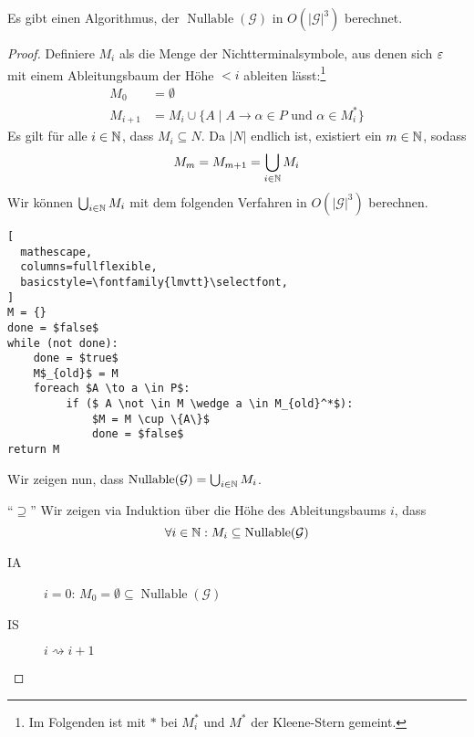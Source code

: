 \begin{Satz}\label{satz:3.nullable}
  Es gibt einen Algorithmus, der $\operatorname{Nullable}(\mathcal{G})$ in $O(|\mathcal{G}|^3)$ berechnet.
\end{Satz}
\begin{proof}
  Definiere $M_i$ als die Menge der Nichtterminalsymbole, aus denen sich
  $\varepsilon$ mit einem Ableitungsbaum der Höhe $< i$ ableiten lässt:\footnote{
  Im Folgenden ist mit $*$ bei $M_i^*$ und $M^*$ der Kleene-Stern gemeint.} 
  \begin{align*}
    M_0 &= \emptyset \\
    M_{i+1} &= M_i \cup \{ A \mid A \to \alpha \in P \text{ und }
              \alpha \in M_i^* \}
  \end{align*}
  Es gilt für alle $i \in \mathbb{N}$, dass $M_i \subseteq N$.
  Da $|N|$ endlich ist, existiert ein $m \in \mathbb{N}$, sodass
  \begin{displaymath}
    M_m = M_{m+1} = \bigcup_{i \in \mathbb{N}} M_i
  \end{displaymath}
  Wir können $\bigcup_{i \in \mathbb{N}} M_i$ mit dem folgenden Verfahren in $O(|\mathcal{G}|^3)$ berechnen.
  
  \begin{center}
  \begin{minipage}{7cm}
  \begin{lstlisting}[
  mathescape,
  columns=fullflexible,
  basicstyle=\fontfamily{lmvtt}\selectfont,
]
M = {}
done = $false$
while (not done):
    done = $true$
    M$_{old}$ = M
    foreach $A \to a \in P$:
         if ($ A \not \in M \wedge a \in M_{old}^*$):
             $M = M \cup \{A\}$
             done = $false$
return M
\end{lstlisting}
\end{minipage}
\end{center}

  Wir zeigen nun, dass $\operatorname{Nullable}(\mathcal{G}) = \bigcup_{i \in \mathbb{N}} M_i$.

  \medskip
  
  "`$\supseteq$"'\quad
  Wir zeigen via Induktion über die Höhe des Ableitungsbaums $i$, dass 
  $$\forall i \in \mathbb{N}: M_i \subseteq \operatorname{Nullable}(\mathcal{G})$$
  \begin{description}
  \item[IA] $i = 0$: $M_0 = \emptyset \subseteq \operatorname{Nullable}(\mathcal{G})$
  \item[IS] $i \rightsquigarrow i+1$


\end{description}
\end{proof}
